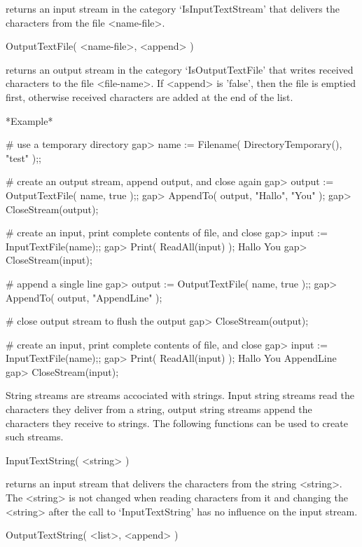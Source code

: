 returns an input stream in the category `IsInputTextStream' that delivers
the characters from the file <name-file>.

\>OutputTextFile( <name-file>, <append> )

returns  an output stream  in the category `IsOutputTextFile' that writes
received characters  to the file   <file-name>.  If <append> is  'false',
then the  file is emptied first,  otherwise received characters are added
at the end of the list.

*Example*

\begintt
    # use a temporary directory
    gap> name := Filename( DirectoryTemporary(), "test" );;

    # create an output stream, append output, and close again
    gap> output := OutputTextFile( name, true );;
    gap> AppendTo( output, "Hallo\n", "You\n" );
    gap> CloseStream(output);

    # create an input, print complete contents of file, and close
    gap> input := InputTextFile(name);;
    gap> Print( ReadAll(input) );
    Hallo
    You
    gap> CloseStream(input);

    # append a single line
    gap> output := OutputTextFile( name, true );; 
    gap> AppendTo( output, "AppendLine\n" );

    # close output stream to flush the output
    gap> CloseStream(output);

    
    # create an input, print complete contents of file, and close
    gap> input := InputTextFile(name);;
    gap> Print( ReadAll(input) );
    Hallo
    You
    AppendLine
    gap> CloseStream(input);
\endtt


String streams are streams accociated with strings.  Input string streams
read  the characters they  deliver from a   string, output string streams
append the characters  they receive to  strings.  The following functions
can be used to create such streams.

\>InputTextString( <string> )

returns an  input stream that  delivers the  characters  from the  string
<string>.  The  <string> is not changed when  reading characters  from it
and  changing  the <string> after  the  call to `InputTextString'  has no
influence on the input stream.

\>OutputTextString( <list>, <append> )

